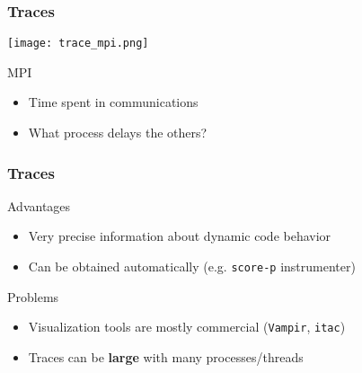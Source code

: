 \documentclass[xcolor={x11names,svgnames}]{beamer}
\begin{document}

\begin{frame}
  \frametitle{Traces}

  \texttt{[image: trace\_mpi.png]}

  \begin{block}{MPI}
    \begin{itemize}
    \item Time spent in communications
    \item What process delays the others?
    \end{itemize}
  \end{block}  
\end{frame}


\begin{frame}
  \frametitle{Traces}

  
  \begin{exampleblock}{Advantages}
    \begin{itemize}
    \item Very precise information about dynamic code behavior
    \item Can be obtained automatically (e.g. \texttt{score-p} instrumenter)
    \end{itemize}
  \end{exampleblock}

  
  \begin{alertblock}{Problems}
    \begin{itemize}
    \item Visualization tools are mostly commercial (\texttt{Vampir}, \texttt{itac})
    \item Traces can be \textbf{large} with many processes/threads
    \end{itemize}
  \end{alertblock}
  
\end{frame}

\end{document}
